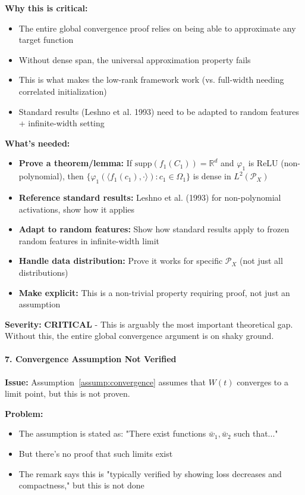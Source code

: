 \textbf{Why this is critical:}
\begin{itemize}
\item The entire global convergence proof relies on being able to approximate any target function
\item Without dense span, the universal approximation property fails
\item This is what makes the low-rank framework work (vs. full-width needing correlated initialization)
\item Standard results (Leshno et al. 1993) need to be adapted to random features + infinite-width setting
\end{itemize}

\textbf{What's needed:}
\begin{itemize}
\item \textbf{Prove a theorem/lemma:} If $\text{supp}(f_1(C_1)) = \mathbb{R}^d$ and $\varphi_1$ is ReLU (non-polynomial), then $\{\varphi_1(\langle f_1(c_1), \cdot\rangle): c_1 \in \Omega_1\}$ is dense in $L^2(\mathcal{P}_X)$
\item \textbf{Reference standard results:} Leshno et al. (1993) for non-polynomial activations, show how it applies
\item \textbf{Adapt to random features:} Show how standard results apply to frozen random features in infinite-width limit
\item \textbf{Handle data distribution:} Prove it works for specific $\mathcal{P}_X$ (not just all distributions)
\item \textbf{Make explicit:} This is a non-trivial property requiring proof, not just an assumption
\end{itemize}

\textbf{Severity:} \textbf{CRITICAL} - This is arguably the most important theoretical gap. Without this, the entire global convergence argument is on shaky ground.

\paragraph*{7. Convergence Assumption Not Verified}

\textbf{Issue:} Assumption~\ref{assump:convergence} assumes that $W(t)$ converges to a limit point, but this is not proven.

\textbf{Problem:}
\begin{itemize}
\item The assumption is stated as: "There exist functions $\bar{w}_1, \bar{w}_2$ such that..."
\item But there's no proof that such limits exist
\item The remark says this is "typically verified by showing loss decreases and compactness," but this is not done
\end{itemize}


